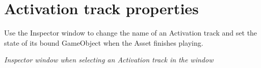 \chapter{Activation track properties}
\hypertarget{md__library_2_package_cache_2com_8unity_8timeline_0d1_87_86_2_documentation_0i_2insp__trk__act}{}\label{md__library_2_package_cache_2com_8unity_8timeline_0d1_87_86_2_documentation_0i_2insp__trk__act}
\label{md__library_2_package_cache_2com_8unity_8timeline_0d1_87_86_2_documentation_0i_2insp__trk__act_autotoc_md1183}%
%
 Use the Inspector window to change the name of an Activation track and set the state of its bound Game\+Object when the  Asset finishes playing.



{\itshape Inspector window when selecting an Activation track in the  window}

